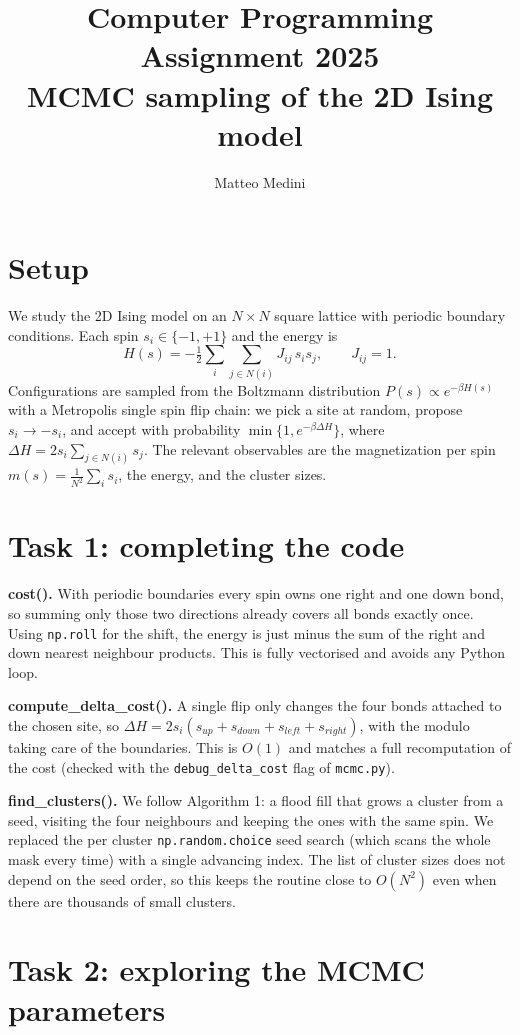 \documentclass[10pt]{article}
\title{\vspace{-1.2cm}Computer Programming Assignment 2025\\ \large MCMC sampling of the 2D Ising model}
\author{Matteo Medini}
\date{}
\begin{document}
\maketitle
\vspace{-0.8cm}

\section{Setup}
We study the 2D Ising model on an $N\times N$ square lattice with periodic boundary
conditions. Each spin $s_i \in \{-1,+1\}$ and the energy is
\[
H(s) = -\tfrac{1}{2}\sum_i \sum_{j\in N(i)} J_{ij}\, s_i s_j , \qquad J_{ij}=1 .
\]
Configurations are sampled from the Boltzmann distribution $P(s)\propto e^{-\beta H(s)}$
with a Metropolis single spin flip chain: we pick a site at random, propose $s_i\to-s_i$,
and accept with probability $\min\{1,e^{-\beta\Delta H}\}$, where
$\Delta H = 2 s_i \sum_{j\in N(i)} s_j$. The relevant observables are the magnetization
per spin $m(s)=\frac{1}{N^2}\sum_i s_i$, the energy, and the cluster sizes.

\section{Task 1: completing the code}
\textbf{cost().} With periodic boundaries every spin owns one right and one down bond, so
summing only those two directions already covers all bonds exactly once. Using
\texttt{np.roll} for the shift, the energy is just minus the sum of the right and down
nearest neighbour products. This is fully vectorised and avoids any Python loop.

\textbf{compute\_delta\_cost().} A single flip only changes the four bonds attached to the
chosen site, so $\Delta H = 2 s_i (s_{up}+s_{down}+s_{left}+s_{right})$, with the modulo
taking care of the boundaries. This is $O(1)$ and matches a full recomputation of the cost
(checked with the \texttt{debug\_delta\_cost} flag of \texttt{mcmc.py}).

\textbf{find\_clusters().} We follow Algorithm 1: a flood fill that grows a cluster from a
seed, visiting the four neighbours and keeping the ones with the same spin. We replaced the
per cluster \texttt{np.random.choice} seed search (which scans the whole mask every time)
with a single advancing index. The list of cluster sizes does not depend on the seed order,
so this keeps the routine close to $O(N^2)$ even when there are thousands of small clusters.

\section{Task 2: exploring the MCMC parameters}
\end{document}
